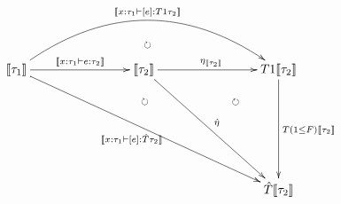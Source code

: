 \documentclass[12pt]{article}
\newcommand{\semanticf}[1]{\llbracket #1\rrbracket}
\begin{document}
\pagestyle{empty}

\begin{align*}
  \vcenter{
    \xymatrix@=80pt{
      \semanticf{\tau_1}
      \ar@/^40pt/@{->}[rr]^{\semanticf{x: \tau_1 \vdash [e]: T 1 \tau_2}}
      \ar@/^20pt/@{{}{ }{}}[rr]|{\circlearrowright}
      \ar@{->}[r]^{\semanticf{x: \tau_1 \vdash e: \tau_2}}
      \ar@{->}[rrd]_{\semanticf{x: \tau_1 \vdash [e]: \hat{T} \tau_2}}
      \ar@/^20pt/@{{}{ }{}}[rrd]|(0.45){\circlearrowright}
      &
      \semanticf{\tau_2}
      \ar@{->}[r]^{\eta_{\semanticf{\tau_2}}}
      \ar@{->}[rd]^{\hat{\eta}}
      \ar@/^30pt/@{{}{ }{}}[rd]|{\circlearrowright}
      &
      T 1 \semanticf{\tau_2}
      \ar@{->}[d]^{T (1 \leq F) \semanticf{\tau_2}}
      \\
      &
      &
      \hat{T} \semanticf{\tau_2}
    }
  }
\end{align*}
\end{document}
